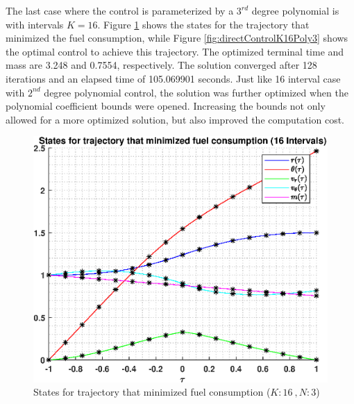 \documentclass[]{article}
\begin{document}
\vspace{2mm}\newline 
The last case where the control is parameterized by a \(3^{rd}\) degree polynomial is with intervals \(K = 16\). Figure \ref{fig:directStatesK16Poly3} shows the states for the trajectory that minimized the fuel consumption, while Figure \ref{fig:directControlK16Poly3} shows the optimal control to achieve this trajectory. The optimized terminal time and mass are 3.248 and 0.7554, respectively. The solution converged after 128 iterations and an elapsed time of 105.069901 seconds. Just like 16 interval case with \(2^{nd}\) degree polynomial control, the solution was further optimized when the polynomial coefficient bounds were opened. Increasing the bounds not only allowed for a more optimized solution, but also improved the computation cost.
\begin{figure}
	\centering
	\includegraphics[scale=0.75]{directStatesK16Poly3.eps}
	\caption{States for trajectory that minimized fuel consumption (\(K:16\ , N:3\))}
	\label{fig:directStatesK16Poly3}
\end{figure}
\end{document}
